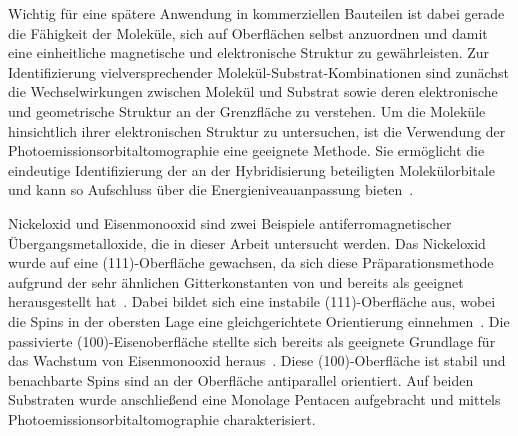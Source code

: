     Wichtig für eine spätere Anwendung in kommerziellen Bauteilen ist dabei gerade die Fähigkeit der Moleküle, sich auf Oberflächen selbst anzuordnen und damit eine einheitliche magnetische und elektronische Struktur zu gewährleisten.
    Zur Identifizierung vielversprechender Molekül-Substrat-Kombinationen sind zunächst die Wechselwirkungen zwischen Molekül und Substrat sowie deren elektronische und geometrische Struktur an der Grenzfläche zu verstehen.
    Um die Moleküle hinsichtlich ihrer elektronischen Struktur zu untersuchen, ist die Verwendung der Photoemissionsorbitaltomographie eine geeignete Methode.
    Sie ermöglicht die eindeutige Identifizierung der an der Hybridisierung beteiligten Molekülorbitale und kann so Aufschluss über die Energieniveauanpassung bieten~\cite{MM_2, MM_5}. %

    Nickeloxid und Eisenmonooxid sind zwei Beispiele antiferromagnetischer Übergangsmetalloxide, die in dieser Arbeit untersucht werden.
    Das Nickeloxid wurde auf eine (111)-Oberfläche gewachsen, da sich diese Präparationsmethode aufgrund der sehr ähnlichen Gitterkonstanten von  und  bereits als geeignet herausgestellt hat~\cite{NiO_37}.
    Dabei bildet sich eine instabile (111)-Oberfläche aus, wobei die Spins in der obersten Lage eine gleichgerichtete Orientierung einnehmen~\cite{cappus_hydroxyl_1993}.
    Die passivierte (100)-Eisenoberfläche stellte sich bereits als geeignete Grundlage für das Wachstum von Eisenmonooxid heraus~\cite{FeO_1}.
    Diese (100)-Oberfläche ist stabil und benachbarte Spins sind an der Oberfläche antiparallel orientiert.
    Auf beiden Substraten wurde anschließend eine Monolage Pentacen aufgebracht und mittels Photoemissionsorbitaltomographie charakterisiert.
    

